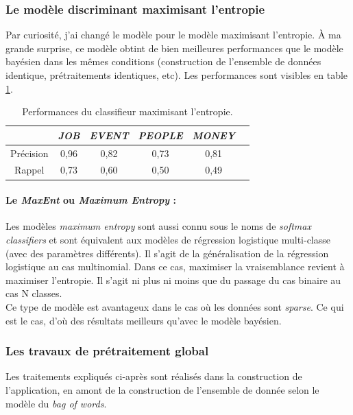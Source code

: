             \subsubsection{Le modèle discriminant maximisant l'entropie}
                Par curiosité, j'ai changé le modèle pour le modèle maximisant l'entropie. À ma grande surprise, ce modèle obtint de bien meilleures performances que le modèle bayésien dans les mêmes conditions (construction de l'ensemble de données identique, prétraitements identiques, etc). Les performances sont visibles en table \ref{tab:classif_perf3}.
                \begin{table}[h]
                    \centering
                    \begin{tabular}{| c | c | c | c | c | c |}
                        \hline
                         & \textit{JOB} & \textit{EVENT} & \textit{PEOPLE} & \textit{MONEY} \\
                        \hline
                        Précision & 0,96 & 0,82 & 0,73 & 0,81 \\
                        Rappel & 0,73 & 0,60 & 0,50 & 0,49 \\
                        \hline
                    \end{tabular}
                    \caption{Performances du classifieur maximisant l'entropie.}
                    \label{tab:classif_perf3}
                \end{table}

                \paragraph{Le \textit{MaxEnt} ou \textit{Maximum Entropy} :}
                    Les modèles \textit{maximum entropy} sont aussi connu sous le noms de \textit{softmax classifiers} et sont équivalent aux modèles de régression logistique multi-classe (avec des paramètres différents). Il s'agit de la généralisation de la régression logistique au cas multinomial. Dans ce cas, maximiser la vraisemblance revient à maximiser l'entropie. Il s'agit ni plus ni moins que du passage du cas binaire au cas N classes.\\
                    Ce type de modèle est avantageux dans le cas où les données sont \textit{sparse}. Ce qui est le cas, d'où des résultats meilleurs qu'avec le modèle bayésien.

            \subsubsection{Les travaux de prétraitement global}
            \label{ssubsec:travaux_globaux}
                Les traitements expliqués ci-après sont réalisés dans la construction de l'application, en amont de la construction de l'ensemble de donnée selon le modèle du \textit{bag of words}.

